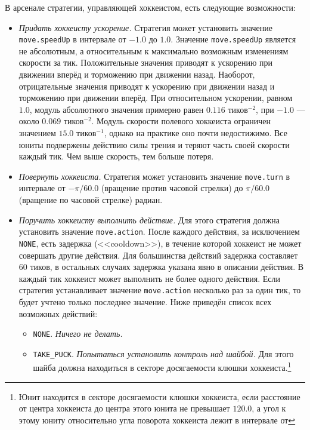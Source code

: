В арсенале стратегии, управляющей хоккеистом, есть следующие возможности:
\begin{itemize}
  \item \textit{Придать хоккеисту ускорение.} Стратегия может установить значение \texttt{move.speedUp} в интервале от $-1.0$ до $1.0$.
        Значение \texttt{move.speedUp} является не абсолютным, а относительным к максимально возможным изменениям скорости за тик.
        Положительные значения приводят к ускорению при движении вперёд и торможению при движении назад. Наоборот, отрицательные значения
        приводят к ускорению при движении назад и торможению при движении вперёд. При относительном ускорении, равном $1.0$, модуль
        абсолютного значения примерно равен $0.116$ тиков$^{-2}$, при $-1.0$ --- около $0.069$ тиков$^{-2}$. Модуль скорости полевого
        хоккеиста ограничен значением $15.0$ тиков$^{-1}$, однако на практике оно почти недостижимо. Все юниты подвержены действию силы
        трения и теряют часть своей скорости каждый тик. Чем выше скорость, тем больше потеря.
  \item \textit{Повернуть хоккеиста.} Стратегия может установить значение \texttt{move.turn} в интервале от $-\pi/60.0$ (вращение против
        часовой стрелки) до $\pi/60.0$ (вращение по часовой стрелке) радиан.
  \item \textit{Поручить хоккеисту выполнить действие.} Для этого стратегия должна установить значение \texttt{move.action}. После каждого
        действия, за исключением \texttt{NONE}, есть задержка (<<cooldown>>), в течение которой хоккеист не может совершать другие действия.
        Для большинства действий задержка составляет $60$ тиков, в остальных случаях задержка указана явно в описании действия. В каждый тик
        хоккеист может выполнить не более одного действия. Если стратегия устанавливает значение \texttt{move.action} несколько раз за один
        тик, то будет учтено только последнее значение. Ниже приведён список всех возможных действий:
  \begin{itemize}
    \item \texttt{NONE}. \textit{Ничего не делать.}
    \item \texttt{TAKE\_PUCK}. \textit{Попытаться установить контроль над шайбой.} Для этого шайба должна находиться в секторе досягаемости
          клюшки хоккеиста.\footnote[3]{Юнит находится в секторе досягаемости клюшки хоккеиста, если расстояние от центра хоккеиста до
          центра этого юнита не превышает $120.0$, а угол к этому юниту относительно угла поворота хоккеиста лежит в интервале от
}
\end{itemize}
\end{itemize}
